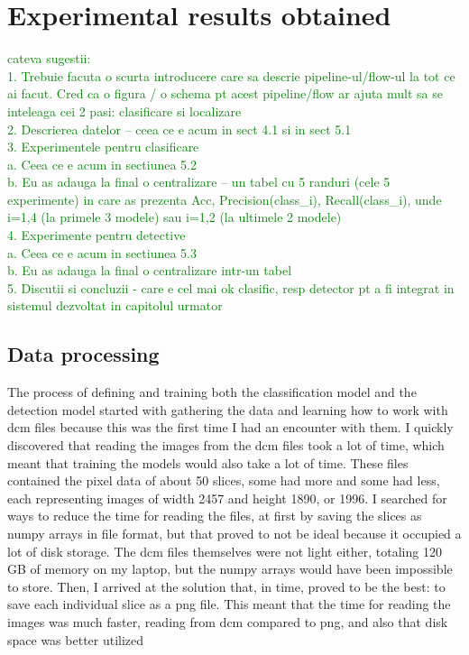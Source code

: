 \chapter{Experimental results obtained}

\textcolor{green}{cateva sugestii:\\
1.	Trebuie facuta o scurta introducere care sa descrie pipeline-ul/flow-ul la tot ce ai facut. Cred ca o figura / o schema pt acest pipeline/flow ar ajuta mult sa se inteleaga cei 2 pasi: clasificare si localizare\\
2.	Descrierea datelor – ceea ce e acum in sect 4.1 si in sect 5.1\\
3.	Experimentele pentru clasificare\\
a.	Ceea ce e acum in sectiunea 5.2\\
b.	Eu as adauga la final o centralizare – un tabel cu 5 randuri (cele 5 experimente) in care as prezenta Acc, Precision(class_i), Recall(class_i), unde i=1,4 (la primele 3 modele) sau i=1,2 (la ultimele 2 modele)\\
4.	Experimente pentru detective \\
a.	Ceea ce e acum in sectiunea 5.3\\
b. 	Eu as adauga la final o centralizare intr-un tabel\\
5. Discutii si concluzii - care e cel mai ok clasific, resp detector pt a fi integrat in sistemul dezvoltat in capitolul urmator
}



\section{Data processing}

The process of defining and training both the classification model and the detection model started with gathering the data and learning how to work with dcm files because this was the first time I had an encounter with them. I quickly discovered that reading the images from the dcm files took a lot of time, which meant that training the models would also take a lot of time. These files contained the pixel data of about 50 slices, some had more and some had less, each representing images of width 2457 and height 1890, or 1996. I searched for ways to reduce the time for reading the files, at first by saving the slices as numpy arrays in file format, but that proved to not be ideal because it occupied a lot of disk storage. The dcm files themselves were not light either, totaling 120 GB of memory on my laptop, but the numpy arrays would have been impossible to store. Then, I arrived at the solution that, in time, proved to be the best: to save each individual slice as a png file. This meant that the time for reading the images was much faster, reading from dcm compared to png, and also that disk space was better utilized

